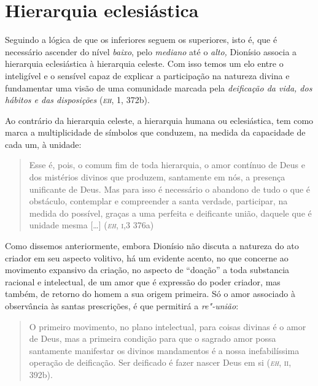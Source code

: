 {\section{Hierarquia eclesiástica}

Seguindo a lógica de que os inferiores seguem os superiores, isto é,
que é necessário ascender do nível \emph{baixo}, pelo
\emph{mediano} até o \emph{alto,} Dionísio associa a hierarquia
eclesiástica à hierarquia celeste. Com isso temos um elo entre o
inteligível e o sensível capaz de explicar a participação na natureza
divina e fundamentar uma visão de uma comunidade marcada pela
\emph{deificação da vida, dos hábitos e das disposições}
(\emph{\textsc{eh}}, 1, 372b).

Ao contrário da hierarquia celeste, a hierarquia humana ou
eclesiástica, tem como marca a multiplicidade de símbolos que conduzem,
na medida da capacidade de cada um, à unidade:

\begin{quote} 
Esse é, pois, o comum fim de toda hierarquia, o amor contínuo de Deus e
dos mistérios divinos que produzem, santamente em nós, a presença
unificante de Deus.  Mas para isso é necessário o abandono de tudo o
que é obstáculo, contemplar e compreender a santa verdade, participar,
na medida do possível, graças a uma perfeita e deificante união,
daquele que é unidade mesma [\ldots{}] (\emph{\textsc{eh}}, \textsc{i},3 376a)
\end{quote} 

Como dissemos anteriormente, embora Dionísio não discuta a natureza do
ato criador em seu aspecto volitivo, há um evidente acento, no que
concerne ao movimento expansivo da criação, no aspecto de “doação” a
toda substancia racional e intelectual, de um amor que é expressão do
poder criador, mas também, de retorno do homem a sua origem primeira.
Só o amor associado à observância às santas prescrições, é que
permitirá a \emph{re"-união}: 

\begin{quote} 
O primeiro movimento, no plano intelectual, para coisas divinas é o
amor de Deus, mas a primeira condição para que o sagrado amor possa
santamente manifestar os divinos mandamentos é a nossa inefabilíssima
operação de deificação. Ser deificado é fazer nascer Deus em si (\emph{\textsc{eh}},
\textsc{ii}, 392b).
\end{quote} 

}
